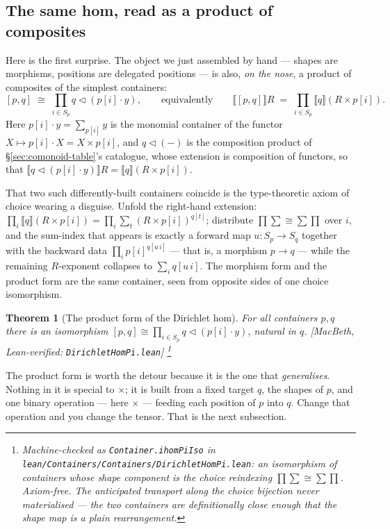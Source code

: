 \documentclass[11pt,a4paper]{book}
\newcommand{\cont}[2]{#1 \triangleleft #2}
\newcommand{\Ext}[1]{\llbracket #1 \rrbracket}
\theoremstyle{plain}
\newtheorem{Theorem}{Theorem}[chapter]
\theoremstyle{definition}
\theoremstyle{remark}
\newcommand{\prov}[1]{\hfill\textsf{\footnotesize[#1]}}
\begin{document}
\subsection{The same hom, read as a product of composites}

Here is the first surprise. The object we just assembled by hand --- shapes are
morphisms, positions are delegated positions --- is also, \emph{on the nose}, a
product of composites of the simplest containers:
\[
   [p,q]\;\cong\;\prod_{i\in S_p}\cont{q}{(p[i]\cdot y)},
   \qquad\text{equivalently}\qquad
   \Ext{[p,q]}R\;=\;\prod_{i\in S_p}\Ext q{(R\times p[i])} .
\]
Here $p[i]\cdot y=\sum_{p[i]}y$ is the monomial container of the functor
$X\mapsto p[i]\cdot X=X\times p[i]$, and $\cont{q}{(-)}$ is the composition product
of §\ref{sec:comonoid-table}'s catalogue, whose extension is composition of
functors, so that $\Ext{\cont{q}{(p[i]\cdot y)}}R=\Ext q{(R\times p[i])}$.

That two such differently-built containers coincide is the type-theoretic axiom of
choice wearing a disguise. Unfold the right-hand extension:
$\prod_i\Ext q{(R\times p[i])}=\prod_i\sum_{t}(R\times p[i])^{q[t]}$; distribute
$\prod\sum\cong\sum\prod$ over $i$, and the sum-index that appears is exactly a
forward map $u\colon S_p\to S_q$ together with the backward data $\prod_i
p[i]^{q[u\,i]}$ --- that is, a morphism $p\to q$ --- while the remaining
$R$-exponent collapses to $\sum_i q[u\,i]$. The morphism form and the product form
are the same container, seen from opposite sides of one choice isomorphism.

\begin{Theorem}[The product form of the Dirichlet hom]\label{thm:pihom}
For all containers $p,q$ there is an isomorphism
$[p,q]\cong\prod_{i\in S_p}\cont{q}{(p[i]\cdot y)}$, natural in $q$.
\prov{MacBeth, Lean-verified: \texttt{DirichletHomPi.lean}}%
\footnote{Machine-checked as \texttt{Container.ihomPiIso} in
\texttt{lean/Containers/Containers/DirichletHomPi.lean}: an isomorphism of
containers whose shape component is the choice reindexing
$\prod\sum\cong\sum\prod$. Axiom-free. The anticipated transport along the choice
bijection never materialised --- the two containers are definitionally close enough
that the shape map is a plain rearrangement.}
\end{Theorem}

The product form is worth the detour because it is the one that \emph{generalises}.
Nothing in it is special to $\times$; it is built from a fixed target $q$, the
shapes of $p$, and one binary operation --- here $\times$ --- feeding each position
of $p$ into $q$. Change that operation and you change the tensor. That is the next
subsection.
\end{document}
